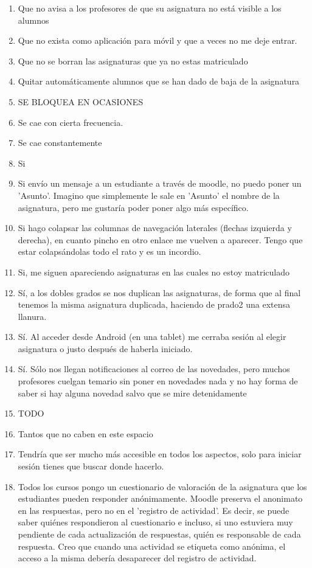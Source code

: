 \begin{enumerate}
\item Que no avisa a los profesores de que su asignatura no está visible a los alumnos
\item Que no exista como aplicación para móvil y que a veces no me deje entrar.
\item Que no se borran las asignaturas que ya no estas matriculado
\item Quitar automáticamente alumnos que se han dado de baja de la asignatura
\item SE BLOQUEA EN OCASIONES
\item Se cae con cierta frecuencia.
\item Se cae constantemente
\item Si
\item Si envío un mensaje a un estudiante a través de moodle, no puedo poner un 'Asunto'. Imagino que simplemente le sale en 'Asunto' el nombre de la asignatura, pero me gustaría poder poner algo más específico.
\item Si hago colapsar las columnas de navegación laterales (flechas izquierda y derecha), en cuanto pincho en otro enlace me vuelven a aparecer. Tengo que estar colapsándolas todo el rato y es un incordio.
\item Si, me siguen apareciendo asignaturas en las cuales no estoy matriculado
\item Sí, a los dobles grados se nos duplican las asignaturas, de forma que al final tenemos la misma asignatura duplicada, haciendo de prado2 una extensa llanura.
\item Sí. Al acceder desde Android (en una tablet) me cerraba sesión al elegir asignatura o justo después de haberla iniciado.
\item Sí. Sólo nos llegan notificaciones al correo de las novedades, pero muchos profesores cuelgan temario sin poner en novedades nada y no hay forma de saber si hay alguna novedad salvo que se mire detenidamente
\item TODO
\item Tantos que no caben en este espacio
\item Tendría que ser mucho más accesible en todos los aspectos, solo para iniciar sesión tienes que buscar donde hacerlo.
\item Todos los cursos pongo un cuestionario de valoración de la asignatura que los estudiantes pueden responder anónimamente. Moodle preserva el anonimato en las respuestas, pero no en el 'registro de actividad'. Es decir, se puede saber quiénes respondieron al cuestionario e incluso, si uno estuviera muy pendiente de cada actualización de respuestas, quién es responsable de cada respuesta. Creo que cuando una actividad se etiqueta como anónima, el acceso a la misma debería desaparecer del registro de actividad.

\end{enumerate}
